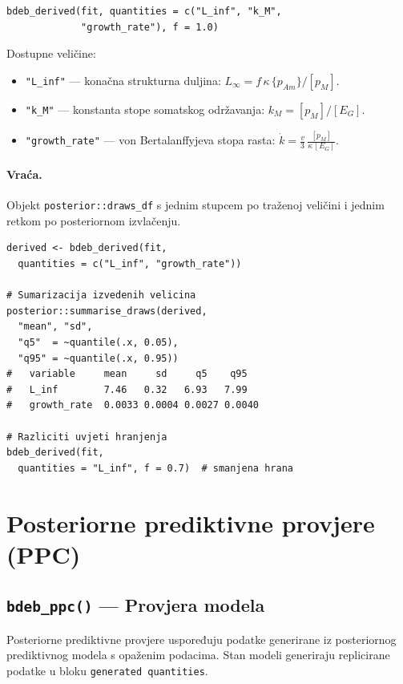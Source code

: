 \documentclass[11pt,a4paper]{article}
\newcommand{\fn}[1]{\texttt{#1()}}
\newcommand{\code}[1]{\texttt{#1}}
\begin{document}
\begin{lstlisting}
bdeb_derived(fit, quantities = c("L_inf", "k_M",
             "growth_rate"), f = 1.0)
\end{lstlisting}

Dostupne veličine:
\begin{itemize}[nosep]
  \item \code{"L\_inf"} --- konačna strukturna duljina:
    $L_\infty = f\,\kappa\,\{p_{Am}\} / [p_M]$.
  \item \code{"k\_M"} --- konstanta stope somatskog održavanja:
    $k_M = [p_M] / [E_G]$.
  \item \code{"growth\_rate"} --- von Bertalanffyjeva stopa rasta:
    $\dot{k} = \frac{v}{3}\,\frac{[p_M]}{\kappa\,[E_G]}$.
\end{itemize}

\paragraph{Vraća.} Objekt \code{posterior::draws\_df} s jednim stupcem po
traženoj veličini i jednim retkom po posteriornom izvlačenju.

\begin{lstlisting}
derived <- bdeb_derived(fit,
  quantities = c("L_inf", "growth_rate"))

# Sumarizacija izvedenih velicina
posterior::summarise_draws(derived,
  "mean", "sd",
  "q5"  = ~quantile(.x, 0.05),
  "q95" = ~quantile(.x, 0.95))
#   variable     mean     sd     q5    q95
#   L_inf        7.46   0.32   6.93   7.99
#   growth_rate  0.0033 0.0004 0.0027 0.0040

# Razliciti uvjeti hranjenja
bdeb_derived(fit,
  quantities = "L_inf", f = 0.7)  # smanjena hrana
\end{lstlisting}


\section{Posteriorne prediktivne provjere (PPC)}
\label{sec:ppc}

\subsection{\fn{bdeb\_ppc} --- Provjera modela}

Posteriorne prediktivne provjere uspoređuju podatke generirane iz
posteriornog prediktivnog modela s opaženim podacima.  Stan modeli
generiraju replicirane podatke u bloku \code{generated quantities}.
\end{document}
